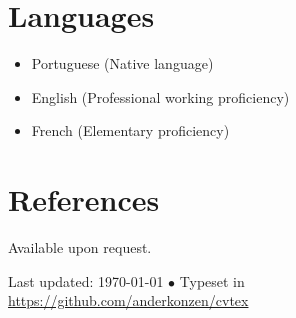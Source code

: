 \documentclass[10pt,a4paper]{article}
\begin{document}
\section*{Languages}

\begin{itemize}
\item Portuguese (Native language)
\item English (Professional working proficiency)
\item French (Elementary proficiency)
\end{itemize}

\section*{References}

Available upon request.

\vfill{}

\begin{center}
{\scriptsize  Last updated: \today\- $\bullet$\- 
Typeset in \href{http://nitens.org/taraborelli/cvtex}{\XeTeX}\\
\href{https://github.com/anderkonzen/cvtex}{https://github.com/anderkonzen/cvtex}}
\end{center}
\end{document}
